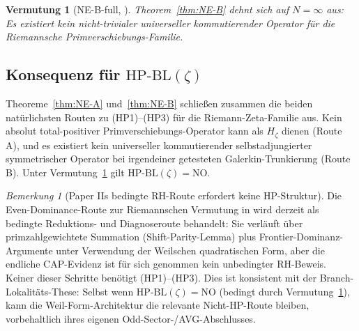\documentclass[11pt]{article}
\newtheorem{conjecture}[theorem]{Vermutung}
\theoremstyle{definition}
\theoremstyle{remark}
\newtheorem{remark}[theorem]{Bemerkung}
\newcommand{\HBL}{\mathrm{HP\text{-}BL}}
\begin{document}
\begin{conjecture}[NE-B-full, {\cite[Conj.~\ref{thm:NE-B}-full]{Geiger2026RHII}}]\label{conj:NE-B-full}
Theorem~\ref{thm:NE-B} dehnt sich auf $N = \infty$ aus: Es existiert kein nicht-trivialer
universeller kommutierender Operator für die Riemannsche Primverschiebungs-Familie.
\end{conjecture}

\subsection{Konsequenz für \texorpdfstring{$\HBL(\zeta)$}{HP-BL(zeta)}}

Theoreme~\ref{thm:NE-A} und~\ref{thm:NE-B} schließen zusammen die beiden
natürlichsten Routen zu (HP1)--(HP3) für die Riemann-Zeta-Familie aus.
Kein absolut total-positiver Primverschiebungs-Operator kann als $H_\zeta$ dienen
(Route A), und es existiert kein universeller kommutierender selbstadjungierter
symmetrischer Operator bei irgendeiner getesteten Galerkin-Trunkierung (Route B). Unter
Vermutung~\ref{conj:NE-B-full} gilt $\HBL(\zeta) = \mathrm{NO}$.

\begin{remark}[Paper IIs bedingte RH-Route erfordert keine HP-Struktur]
\label{rem:riemann-without-hp}
Die Even-Dominance-Route zur Riemannschen Vermutung in
\cite{Geiger2026RHII} wird derzeit als bedingte Reduktions- und
Diagnoseroute behandelt: Sie verläuft über primzahlgewichtete Summation
(Shift-Parity-Lemma) plus Frontier-Dominanz-Argumente unter Verwendung
der Weilschen quadratischen Form, aber die endliche CAP-Evidenz ist für
sich genommen kein unbedingter RH-Beweis. Keiner dieser Schritte
benötigt (HP1)--(HP3). Dies ist konsistent mit der
Branch-Lokalitäts-These: Selbst wenn $\HBL(\zeta) = \mathrm{NO}$
(bedingt durch Vermutung~\ref{conj:NE-B-full}), kann die
Weil-Form-Architektur die relevante Nicht-HP-Route bleiben, vorbehaltlich
ihres eigenen Odd-Sector-/AVG-Abschlusses.
\end{remark}
\end{document}
